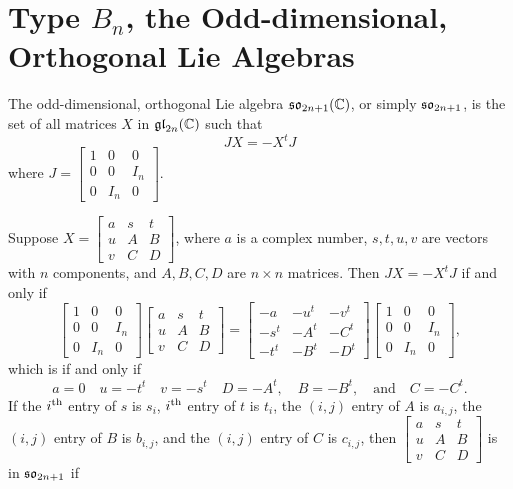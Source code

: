 \section{Type \texorpdfstring{$B_n$}{Bn}, the Odd-dimensional, Orthogonal
  Lie Algebras}

The odd-dimensional, orthogonal Lie algebra $\mathfrak {so}_{2n+1}({\mathbb C})$, or simply
$\mathfrak {so}_{2n+1}$, is the set of all matrices $X$ in $\mathfrak {gl}_{2n}({\mathbb C})$ such that
\[
JX= -X^t J
\]
where $J= \left[\begin{smallmatrix} 1&0&0\\ 0 &0&I_n\\ 0&I_n
    &0\end{smallmatrix} \right]$.  

Suppose $X=\left[\begin{smallmatrix} a&s&t\\ u&A&B\\ v&C&
    D \end{smallmatrix} \right]$, where $a$ is a complex number, $s,t,u,v$
are vectors with $n$ components, and $A, B, C, D$ are $n\times n$
matrices. Then $JX= -X^t J$ if and only if
\[
\begin{bmatrix}
  1&0&0\\ 0&0&I_n\\ 0&I_n& 0
\end{bmatrix}
\begin{bmatrix}
  a&s&t\\ u&A&B\\ v&C& D
\end{bmatrix}
=
\begin{bmatrix}
  -a&-u^t&-v^t\\-s^t&-A^t&-C^t\\ -t^t&-B^t&-D^t
\end{bmatrix}
\begin{bmatrix}
  1&0&0\\ 0&0&I_n\\ 0&I_n& 0
\end{bmatrix},
\]
which is if and only if
\[
a=0\quad u=-t^t \quad v=-s^t\quad D=-A^t,\quad B=-B^t,\quad\text{and} \quad
C=-C^t.
\]
If the $i{^{\text{th}}}$ entry of $s$ is $s_i$, $i{^{\text{th}}}$ entry of $t$ is $t_i$, the
$(i,j)$ entry of $A$ is $a_{i,j}$, the $(i,j)$ entry of $B$ is $b_{i,j}$,
and the $(i,j)$ entry of $C$ is $c_{i,j}$, then $\left[\begin{smallmatrix}
    a&s&t\\ u&A&B\\ v&C& D \end{smallmatrix} \right]$ is in $\mathfrak {so}_{2n+1}$ if

